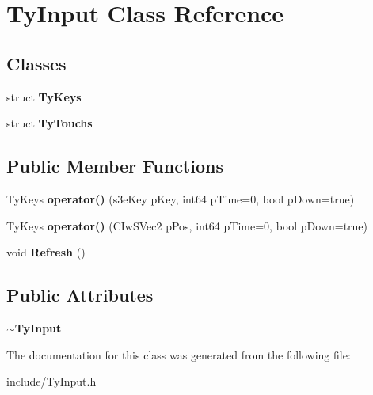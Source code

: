 \hypertarget{class_ty_input}{
\section{TyInput Class Reference}
\label{class_ty_input}
}
\subsection*{Classes}
\begin{DoxyCompactItemize}
\item 
struct {\bfseries TyKeys}
\item 
struct {\bfseries TyTouchs}
\end{DoxyCompactItemize}
\subsection*{Public Member Functions}
\begin{DoxyCompactItemize}
\item 
\hypertarget{class_ty_input_a30aa88b15887f8765e3cb7e0bf7f4084}{
TyKeys {\bfseries operator()} (s3eKey pKey, int64 pTime=0, bool pDown=true)}
\label{class_ty_input_a30aa88b15887f8765e3cb7e0bf7f4084}

\item 
\hypertarget{class_ty_input_ac6f7a1a66eb8925233d83f3dbf9ba0ea}{
TyKeys {\bfseries operator()} (CIwSVec2 pPos, int64 pTime=0, bool pDown=true)}
\label{class_ty_input_ac6f7a1a66eb8925233d83f3dbf9ba0ea}

\item 
\hypertarget{class_ty_input_a0c1f8ad9e16d2f4fbcec499ecb710c3e}{
void {\bfseries Refresh} ()}
\label{class_ty_input_a0c1f8ad9e16d2f4fbcec499ecb710c3e}

\end{DoxyCompactItemize}
\subsection*{Public Attributes}
\begin{DoxyCompactItemize}
\item 
\hypertarget{class_ty_input_a524d21c20fedb3f6af54d1166b21b07c}{
{\bfseries $\sim$TyInput}}
\label{class_ty_input_a524d21c20fedb3f6af54d1166b21b07c}

\end{DoxyCompactItemize}


The documentation for this class was generated from the following file:\begin{DoxyCompactItemize}
\item 
include/TyInput.h\end{DoxyCompactItemize}
